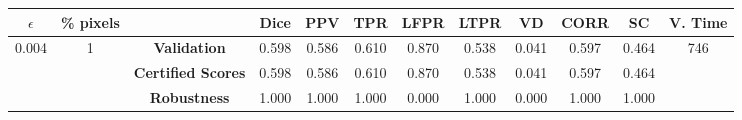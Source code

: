 \begin{longtable}{ c  c | c | c  c  c  c  c  c  c c c}
\toprule \textbf{$\epsilon$} & \textbf{\% pixels} & & \textbf{Dice} & \textbf{PPV} & \textbf{TPR} & \textbf{LFPR} & \textbf{LTPR} & \textbf{VD} & \textbf{CORR} & \textbf{SC} & \textbf{V. Time} \\
\midrule 
\multirow{3}{*}{0.004}  & \multirow{3}{*}{1} &\textbf{Validation} & 0.598 & 0.586 & 0.610 & 0.870 & 0.538 & 0.041 & 0.597 & 0.464 & \multirow{3}{*}{746} \\
 & & \textbf{Certified Scores} & 0.598 & 0.586 & 0.610 & 0.870 & 0.538 & 0.041 & 0.597 & 0.464 & \\
& & \textbf{Robustness} & 1.000 & 1.000 & 1.000 & 0.000 & 1.000 & 0.000 & 1.000 & 1.000 & \\
\end{longtable}